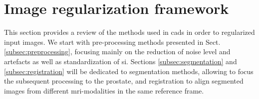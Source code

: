 \section{Image regularization framework} \label{sec:imaprocfra}

This section provides a review of the methods used in \acp{cad} in order to regularized input images. We start with pre-processing methods presented in Sect. \ref{subsec:preprocessing}, focusing mainly on the reduction of noise level and artefacts as well as standardization of \ac{si}. Sections \ref{subsec:segmentation} and \ref{subsec:registration} will be dedicated to segmentation methods, allowing to focus the subsequent processing to the prostate, and registration to align segmented images from different \ac{mri}-modalities in the same reference frame.






